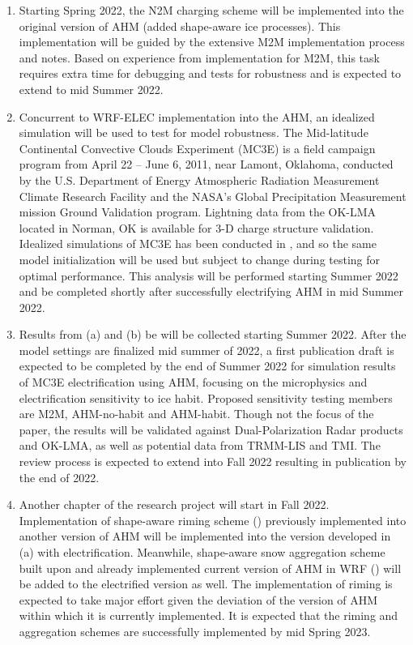 \begin{enumerate}[label=(\alph*)]
    \item{Starting Spring 2022, the N2M charging scheme will be implemented into the original version of AHM (added shape-aware ice processes). This implementation will be guided by the extensive M2M implementation process and notes. Based on experience from implementation for M2M, this task requires extra time for debugging and tests for robustness and is expected to extend to mid Summer 2022.}
    \item{Concurrent to WRF-ELEC implementation into the AHM, an idealized simulation will be used to test for model robustness. The Mid-latitude Continental Convective Clouds Experiment (MC3E) is a field campaign program from April 22 – June 6, 2011, near Lamont, Oklahoma, conducted by the U.S. Department of Energy Atmospheric Radiation Measurement Climate Research Facility and the NASA's Global Precipitation Measurement mission Ground Validation program. Lightning data from the OK-LMA located in Norman, OK is available for 3-D charge structure validation. Idealized simulations of MC3E has been conducted in \cite{sulia2021new}, and so the same model initialization will be used but subject to change during testing for optimal performance. This analysis will be performed starting Summer 2022 and be completed shortly after successfully electrifying AHM in mid Summer 2022.}
    \item{Results from (a) and (b) be will be collected starting Summer 2022. After the model settings are finalized mid summer of 2022, a first publication draft is expected to be completed by the end of Summer 2022 for simulation results of MC3E electrification using AHM, focusing on the microphysics and electrification sensitivity to ice habit. Proposed sensitivity testing members are M2M, AHM-no-habit and AHM-habit. Though not the focus of the paper, the results will be validated against Dual-Polarization Radar products and OK-LMA, as well as potential data from TRMM-LIS and TMI. The review process is expected to extend into Fall 2022 resulting in publication by the end of 2022.}
    \item{Another chapter of the research project will start in Fall 2022. Implementation of shape-aware riming scheme (\cite{jensen2015modeling}) previously implemented into another version of AHM will be implemented into the version developed in (a) with electrification. Meanwhile, shape-aware snow aggregation scheme built upon \cite{przybylo2019ice} and already implemented current version of AHM in WRF (\cite{sulia2021new}) will be added to the electrified version as well. The implementation of riming is expected to take major effort given the deviation of the version of AHM within which it is currently implemented. It is expected that the riming and aggregation schemes are successfully implemented by mid Spring 2023.}

\end{enumerate}
